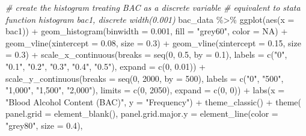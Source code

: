 \documentclass[
  11pt,
]{article}
\newenvironment{Shaded}{\begin{snugshade}}{\end{snugshade}}
\newcommand{\AttributeTok}[1]{\textcolor[rgb]{0.77,0.63,0.00}{#1}}
\newcommand{\CommentTok}[1]{\textcolor[rgb]{0.56,0.35,0.01}{\textit{#1}}}
\newcommand{\ConstantTok}[1]{\textcolor[rgb]{0.00,0.00,0.00}{#1}}
\newcommand{\DecValTok}[1]{\textcolor[rgb]{0.00,0.00,0.81}{#1}}
\newcommand{\FloatTok}[1]{\textcolor[rgb]{0.00,0.00,0.81}{#1}}
\newcommand{\FunctionTok}[1]{\textcolor[rgb]{0.00,0.00,0.00}{#1}}
\newcommand{\NormalTok}[1]{#1}
\newcommand{\SpecialCharTok}[1]{\textcolor[rgb]{0.00,0.00,0.00}{#1}}
\newcommand{\StringTok}[1]{\textcolor[rgb]{0.31,0.60,0.02}{#1}}
\begin{document}
\begin{Shaded}
\begin{Highlighting}[]
\CommentTok{\# create the histogram treating BAC as a discrete variable}
\CommentTok{\# equivalent to stata function histogram bac1, discrete width(0.001)}
\NormalTok{bac\_data }\SpecialCharTok{\%\textgreater{}\%}
  \FunctionTok{ggplot}\NormalTok{(}\FunctionTok{aes}\NormalTok{(}\AttributeTok{x =}\NormalTok{ bac1)) }\SpecialCharTok{+}
  \FunctionTok{geom\_histogram}\NormalTok{(}\AttributeTok{binwidth =} \FloatTok{0.001}\NormalTok{, }\AttributeTok{fill =} \StringTok{"grey60"}\NormalTok{, }\AttributeTok{color =} \ConstantTok{NA}\NormalTok{) }\SpecialCharTok{+}
  \FunctionTok{geom\_vline}\NormalTok{(}\AttributeTok{xintercept =} \FloatTok{0.08}\NormalTok{, }\AttributeTok{size =} \FloatTok{0.3}\NormalTok{) }\SpecialCharTok{+}
  \FunctionTok{geom\_vline}\NormalTok{(}\AttributeTok{xintercept =} \FloatTok{0.15}\NormalTok{, }\AttributeTok{size =} \FloatTok{0.3}\NormalTok{) }\SpecialCharTok{+}
  \FunctionTok{scale\_x\_continuous}\NormalTok{(}\AttributeTok{breaks =} \FunctionTok{seq}\NormalTok{(}\DecValTok{0}\NormalTok{, }\FloatTok{0.5}\NormalTok{, }\AttributeTok{by =} \FloatTok{0.1}\NormalTok{),}
                     \AttributeTok{labels =} \FunctionTok{c}\NormalTok{(}\StringTok{"0"}\NormalTok{, }\StringTok{"0.1"}\NormalTok{, }\StringTok{"0.2"}\NormalTok{, }\StringTok{"0.3"}\NormalTok{, }\StringTok{"0.4"}\NormalTok{, }\StringTok{"0.5"}\NormalTok{),}
                     \AttributeTok{expand =} \FunctionTok{c}\NormalTok{(}\DecValTok{0}\NormalTok{, }\FloatTok{0.01}\NormalTok{)) }\SpecialCharTok{+}
  \FunctionTok{scale\_y\_continuous}\NormalTok{(}\AttributeTok{breaks =} \FunctionTok{seq}\NormalTok{(}\DecValTok{0}\NormalTok{, }\DecValTok{2000}\NormalTok{, }\AttributeTok{by =} \DecValTok{500}\NormalTok{),}
                     \AttributeTok{labels =} \FunctionTok{c}\NormalTok{(}\StringTok{"0"}\NormalTok{, }\StringTok{"500"}\NormalTok{, }\StringTok{"1,000"}\NormalTok{, }\StringTok{"1,500"}\NormalTok{, }\StringTok{"2,000"}\NormalTok{),}
                     \AttributeTok{limits =} \FunctionTok{c}\NormalTok{(}\DecValTok{0}\NormalTok{, }\DecValTok{2050}\NormalTok{),}
                     \AttributeTok{expand =} \FunctionTok{c}\NormalTok{(}\DecValTok{0}\NormalTok{, }\DecValTok{0}\NormalTok{)) }\SpecialCharTok{+}
  \FunctionTok{labs}\NormalTok{(}\AttributeTok{x =} \StringTok{"Blood Alcohol Content (BAC)"}\NormalTok{, }\AttributeTok{y =} \StringTok{"Frequency"}\NormalTok{) }\SpecialCharTok{+}
  \FunctionTok{theme\_classic}\NormalTok{() }\SpecialCharTok{+}
  \FunctionTok{theme}\NormalTok{(}
    \AttributeTok{panel.grid =} \FunctionTok{element\_blank}\NormalTok{(),}
    \AttributeTok{panel.grid.major.y =} \FunctionTok{element\_line}\NormalTok{(}\AttributeTok{color =} \StringTok{"grey80"}\NormalTok{, }\AttributeTok{size =} \FloatTok{0.4}\NormalTok{),}

\end{Highlighting}
\end{Shaded}
\end{document}

